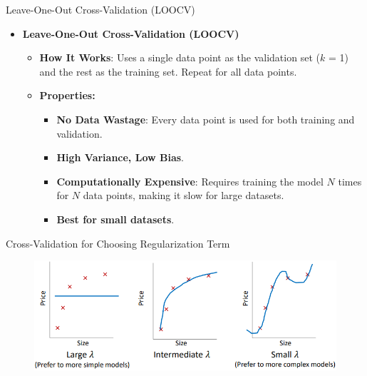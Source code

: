 \documentclass[serif, aspectratio=169]{beamer}
\begin{document}
\begin{frame}{Leave-One-Out Cross-Validation (LOOCV)}
    \begin{itemize}
        \item \textbf{Leave-One-Out Cross-Validation (LOOCV)}
            \medskip
            \begin{itemize}\itemsep1em
            \item \justifying \textbf{How It Works}:
            Uses a single data point as the validation set ($k$ = 1) and the rest as the training set. Repeat for all data points.
            \item \textbf{Properties:}
            \smallskip
            \begin{itemize}\itemsep.5em
                \item \textbf{No Data Wastage}:
                Every data point is used for both training and validation.
                \item \textbf{High Variance, Low Bias}.
                \item \justifying \textbf{Computationally Expensive}: 
                Requires training the model $N$ times for $N$ data points, making it slow for large datasets.
                \item \textbf{Best for small datasets}.
            \end{itemize}
        \end{itemize}
    \end{itemize}
\end{frame}

\begin{frame}{Cross-Validation for Choosing Regularization Term}
    \begin{figure}
        \centering
        \includegraphics[width=0.8\linewidth]{pic/Figure_29.png}
    \end{figure}
    \vfill
\end{frame}
\end{document}
